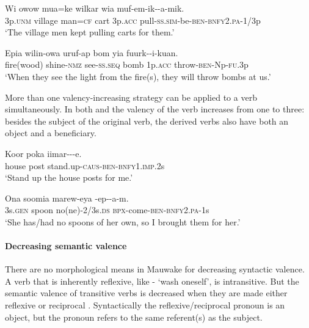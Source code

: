 \ea%
\label{ex:3:x1004}
\gll Wi owow mua=ke wilkar wia muf-em-ik--a-mik.\\
3p.\textsc{unm} village man=\textsc{cf} cart 3p.\textsc{acc} pull-\textsc{ss}.\textsc{sim}-be-\textsc{ben}-\textsc{bnfy}2.\textsc{pa}-1/3p\\
\glt`The village men kept pulling carts for them.'
\z

\ea%
\label{ex:3:x1005}
\gll Epia wilin-owa uruf-ap bom yia fuurk--i-kuan.\\
fire(wood) shine-\textsc{nmz} see-\textsc{ss}.\textsc{seq} bomb 1p.\textsc{acc} throw-\textsc{ben}-Np-\textsc{fu}.3p\\
\glt`When they see the light from the fire(s), they will throw bombs at us.'
\z

More than one valency-increasing strategy can be applied to a verb simultaneously. In both  and  the valency of the verb increases from one to three: besides the subject of the original verb, the derived verbs also have both an object and a beneficiary.

\ea%
\label{ex:3:x1007}
\gll Koor poka iimar---e. \\
house post stand.up-\textsc{caus}-\textsc{ben}-\textsc{bnfy}1.\textsc{imp}.2s\\
\glt`Stand up the house posts for me.'
\z

\ea%
\label{ex:3:x1008}
\gll Ona soomia marew-eya -ep--a-m. \\
3s.\textsc{gen} spoon no(ne)-2/3s.\textsc{ds} \textsc{bpx}-come-\textsc{ben}-\textsc{bnfy}2.\textsc{pa}-1s\\
\glt`She has/had no spoons of her own, so I brought them for her.'
\z

\paragraph{Decreasing semantic valence}\label{sec:3.8.4.3.3}
{}
There are no morphological means in Mauwake for decreasing syntactic valence. A verb that is inherently reflexive, like - `wash oneself', is intransitive. But the semantic valence of transitive verbs is decreased when they are made either reflexive  or reciprocal  . Syntactically the reflexive/reciprocal pronoun is an object, but the pronoun refers to the same referent(s) as the subject. 


